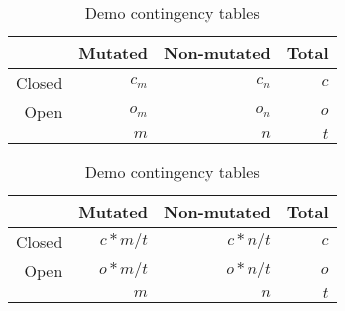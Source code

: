 \begin{table}[!htb]
    \caption{Demo contingency tables}
    \begin{subtable}[!h]{.5\textwidth}
        \centering
        \begin{tabular}{r|rr|r}
             & Mutated & Non-mutated & Total  \\
        \hline
            Closed & $c_m$ & $c_n$ & $c$ \\
            Open & $o_m$ & $o_n$ & $o$ \\
        \hline    
             & $m$ & $n$ & $t$ \\
        \end{tabular}
    \label{tab:count_obs_demo}
    \end{subtable} 
    \quad %
    \begin{subtable}[!h]{.5\textwidth}
        \centering
        \begin{tabular}{r|rr|r}
             & Mutated & Non-mutated & Total  \\
        \hline     
            Closed & $c*m/t$ & $c*n/t$ & $c$ \\
            Open & $o*m/t$ & $o*n/t$ & $o$ \\
        \hline    
             & $m$ & $n$ & $t$ \\
        \end{tabular}
    \label{tab:count_exp_demo}
    \end{subtable}    
\end{table}